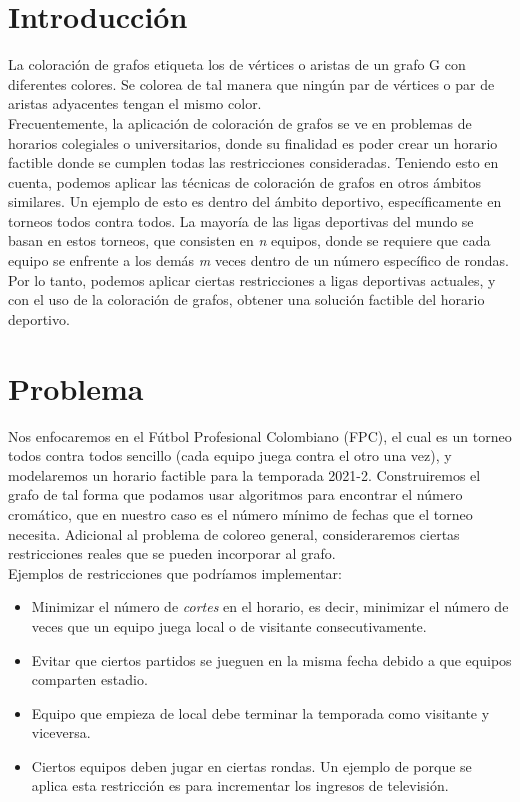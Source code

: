 \documentclass[11pt]{article}
\begin{document}
    \begin{multicols}{2}
    \setcounter{page}{1}

        \section{Introducción}
            La coloración de grafos etiqueta los de vértices o aristas de un grafo G con diferentes colores. 
            Se colorea de tal manera que ningún par de vértices o par de aristas adyacentes tengan el mismo color.\\
            Frecuentemente, la aplicación de coloración de grafos se ve en problemas de horarios colegiales o 
            universitarios, donde su finalidad es poder crear un horario factible donde se cumplen todas las restricciones consideradas. 
            Teniendo esto en cuenta, podemos aplicar las técnicas de coloración de grafos en otros ámbitos similares. 
            Un ejemplo de esto es dentro del ámbito deportivo, específicamente en torneos todos contra todos. La mayoría de las 
            ligas deportivas del mundo se basan en estos torneos, que consisten en \textit{n} equipos, donde se requiere que cada equipo se 
            enfrente a los demás \textit{m} veces dentro de un número específico de rondas. Por lo tanto, podemos aplicar ciertas 
            restricciones a ligas deportivas actuales, y con el uso de la coloración de grafos, obtener una solución factible
            del horario deportivo. 

        \section{Problema}
            Nos enfocaremos en el Fútbol Profesional Colombiano (FPC), el cual es un torneo todos contra todos sencillo 
            (cada equipo juega contra el otro una vez),  y modelaremos un horario factible para la temporada 2021-2. Construiremos el grafo de tal forma que podamos 
            usar algoritmos para encontrar el número cromático, que en nuestro caso es el número mínimo de fechas que el torneo necesita.
            Adicional al problema de coloreo general, consideraremos ciertas restricciones reales que se pueden incorporar al grafo.\\[10pt]
            Ejemplos de restricciones que podríamos implementar:

            \begin{itemize}
                \item Minimizar el número de \textit{cortes} en el horario, es decir, minimizar el número de veces que un equipo juega local o de visitante consecutivamente.
                \item Evitar que ciertos partidos se jueguen en la misma fecha debido a que equipos comparten estadio.
                \item Equipo que empieza de local debe terminar la temporada como visitante y viceversa.
                \item Ciertos equipos deben jugar en ciertas rondas. Un ejemplo de porque se aplica esta restricción es para incrementar los ingresos de televisión.
            \end{itemize}
   

\end{multicols}
\end{document}
